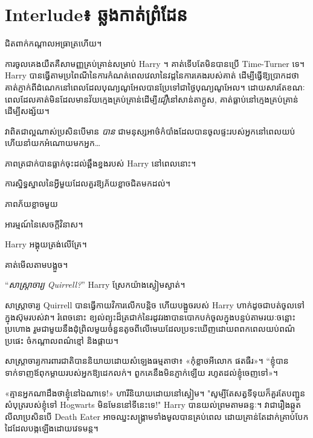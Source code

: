 \chapter{Interlude៖ ឆ្លងកាត់ព្រំដែន}

 ជិតពាក់កណ្តាលអធ្រាត្រហើយ។

\hplettrineextrapara
ការចូលគេងយឺតគឺសាមញ្ញគ្រប់គ្រាន់សម្រាប់ Harry ។ គាត់ទើបតែមិនបានប្រើ Time-Turner ទេ។ Harry បានធ្វើតាមប្រពៃណីនៃការកំណត់ពេលវេលានៃវដ្តនៃការគេងរបស់គាត់ ដើម្បីធ្វើឱ្យប្រាកដថាគាត់ភ្ញាក់ពីដំណេកនៅពេលដែលបុណ្យណូអែលបានប្រែទៅជាថ្ងៃបុណ្យណូអែល។ ដោយសារតែខណៈពេលដែលគាត់មិនដែលមានវ័យក្មេងគ្រប់គ្រាន់ដើម្បី\emph{ជឿ}នៅសាន់តាក្លូស, គាត់ធ្លាប់នៅក្មេងគ្រប់គ្រាន់ដើម្បីសង្ស័យ។

វាពិតជាល្អណាស់ប្រសិនបើមាន \emph{បាន} ជាមនុស្សអាថ៌កំបាំងដែលបានចូលផ្ទះរបស់អ្នកនៅពេលយប់ ហើយនាំយកអំណោយមកអ្នក…

ភាពត្រជាក់បានធ្លាក់ចុះដល់ឆ្អឹងខ្នងរបស់ Harry នៅពេលនោះ។

ការស្និទ្ធស្នាលនៃអ្វីមួយដែលគួរឱ្យភ័យខ្លាចជិតមកដល់។

ភាព​ភ័យ​ខ្លាច​មួយ

អារម្មណ៍នៃសេចក្តីវិនាស។

Harry អង្គុយត្រង់លើគ្រែ។

គាត់មើលតាមបង្អួច។

“\emph{សាស្រ្តាចារ្យ Quirrell?}” Harry ស្រែកយ៉ាងស្ងៀមស្ងាត់។

សាស្ត្រាចារ្យ Quirrell បានធ្វើកាយវិការលើកបន្តិច ហើយបង្អួចរបស់ Harry ហាក់ដូចជាបត់ចូលទៅក្នុងស៊ុមរបស់វា។ រំពេចនោះ ខ្យល់ព្យុះដ៏ត្រជាក់នៃរដូវរងាបានបោកបក់ចូលក្នុងបន្ទប់តាមរយៈចន្លោះប្រហោង រួមជាមួយនឹងដុំព្រិលមួយចំនួនតូចពីលើមេឃដែលប្រទះឃើញដោយពពកពេលយប់ពណ៌ប្រផេះ ចំកណ្តាលពណ៌ខ្មៅ និងផ្កាយ។

សាស្ត្រាចារ្យ​ការពារ​ជាតិ​បាន​និយាយ​ដោយ​សំឡេង​ធម្មតា​ថា​៖ «​កុំ​ខ្លាច​អី​លោក ផតធឺរ»។ “ខ្ញុំបានទាក់ទាញឪពុកម្តាយរបស់អ្នកឱ្យដេកលក់។ ពួក​គេ​នឹង​មិន​ភ្ញាក់​ឡើយ រហូត​ដល់​ខ្ញុំ​ចេញ​ទៅ»។

«គ្មានអ្នកណាដឹងថាខ្ញុំនៅឯណាទេ!» ហារី​និយាយ​ដោយ​នៅ​ស្ងៀម​។ "សូម្បីតែសត្វទីទុយក៏គួរតែបញ្ជូនសំបុត្ររបស់ខ្ញុំទៅ Hogwarts មិនមែននៅទីនេះទេ!" Harry បានយល់ព្រមតាមឆន្ទៈ។ វា​ជា​រឿង​ឆ្កួត​លីលា​ប្រសិន​បើ​ Death Eater អាច​ឈ្នះ​សង្រ្គាម​ទាំង​មូល​បាន​គ្រប់​ពេល ដោយ​គ្រាន់​តែ​ដាក់​គ្រាប់បែក​ដៃ​ដែល​បង្ក​ឡើង​ដោយ​វេទមន្ត។

